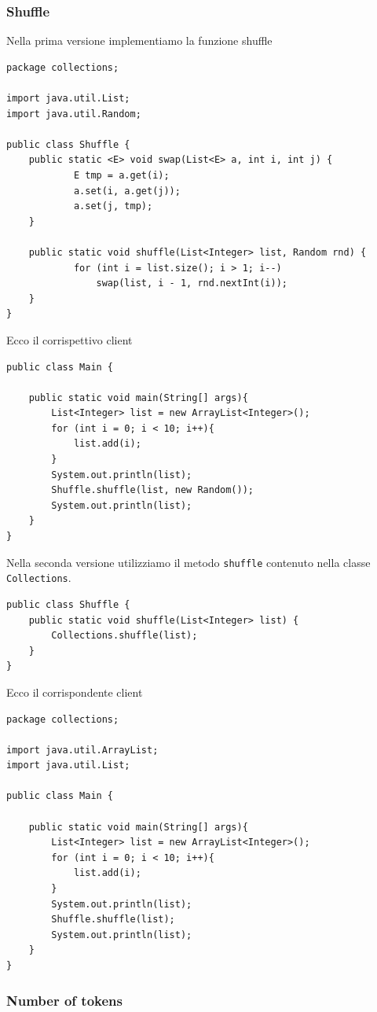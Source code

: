 \documentclass{article}
\begin{document}
\subsubsection{Shuffle}

Nella prima versione implementiamo la funzione shuffle 
\begin{lstlisting}
package collections;

import java.util.List;
import java.util.Random;

public class Shuffle {
	public static <E> void swap(List<E> a, int i, int j) {
		    E tmp = a.get(i);
		    a.set(i, a.get(j));
		    a.set(j, tmp);
	}
	
	public static void shuffle(List<Integer> list, Random rnd) {
		    for (int i = list.size(); i > 1; i--)
		        swap(list, i - 1, rnd.nextInt(i));
	}
}
\end{lstlisting}
Ecco il corrispettivo client
\begin{lstlisting}
public class Main {

	public static void main(String[] args){
		List<Integer> list = new ArrayList<Integer>();
		for (int i = 0; i < 10; i++){
			list.add(i);
		}
		System.out.println(list);
		Shuffle.shuffle(list, new Random());
		System.out.println(list);
	}
}
\end{lstlisting}
Nella seconda versione utilizziamo il metodo \texttt{shuffle} contenuto nella classe \texttt{Collections}.

\begin{lstlisting}
public class Shuffle {
	public static void shuffle(List<Integer> list) {
		Collections.shuffle(list);
	}
}
\end{lstlisting}
Ecco il corrispondente client
\begin{lstlisting}
package collections;

import java.util.ArrayList;
import java.util.List;

public class Main {

	public static void main(String[] args){
		List<Integer> list = new ArrayList<Integer>();
		for (int i = 0; i < 10; i++){
			list.add(i);
		}
		System.out.println(list);
		Shuffle.shuffle(list);
		System.out.println(list);
	}
}
\end{lstlisting}


\subsubsection{Number of tokens}
\end{document}
